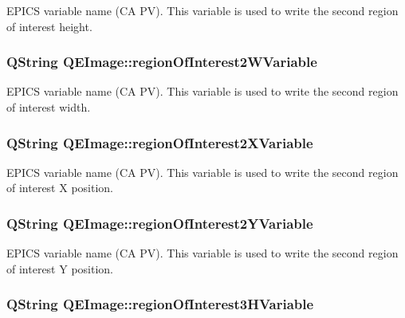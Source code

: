 \label{classQEImage_a0a1ae6f9b52eebd5c1c8a2849387f933}
EPICS variable name (CA PV). This variable is used to write the second region of interest height. \hypertarget{classQEImage_aa5daa92105cbd176c587edb4c5f6dd48}{
\subsubsection[{regionOfInterest2WVariable}]{\setlength{\rightskip}{0pt plus 5cm}QString QEImage::regionOfInterest2WVariable}}
\label{classQEImage_aa5daa92105cbd176c587edb4c5f6dd48}
EPICS variable name (CA PV). This variable is used to write the second region of interest width. \hypertarget{classQEImage_ad2fef828e600b515921b62cbd5ade25e}{
\subsubsection[{regionOfInterest2XVariable}]{\setlength{\rightskip}{0pt plus 5cm}QString QEImage::regionOfInterest2XVariable}}
\label{classQEImage_ad2fef828e600b515921b62cbd5ade25e}
EPICS variable name (CA PV). This variable is used to write the second region of interest X position. \hypertarget{classQEImage_af3d8ee50db0406313b508105e0d5a5b5}{
\subsubsection[{regionOfInterest2YVariable}]{\setlength{\rightskip}{0pt plus 5cm}QString QEImage::regionOfInterest2YVariable}}
\label{classQEImage_af3d8ee50db0406313b508105e0d5a5b5}
EPICS variable name (CA PV). This variable is used to write the second region of interest Y position. \hypertarget{classQEImage_a1346409293aef0cbd49bfda451e3896d}{
\subsubsection[{regionOfInterest3HVariable}]{\setlength{\rightskip}{0pt plus 5cm}QString QEImage::regionOfInterest3HVariable}}

